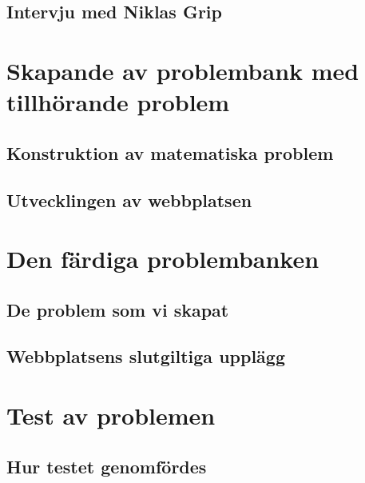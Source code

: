 \documentclass[11pt,a4paper]{article}
\begin{document}
    
    \subsection{Intervju med Niklas Grip}
    
    \label{sec:intervju}
    
\section{Skapande av problembank med tillhörande problem}
    
    
    \subsection{Konstruktion av matematiska problem}
    \label{sec:Skapandetavproblem}
        

    \subsection{Utvecklingen av webbplatsen}
        
        
\section{Den färdiga problembanken}
        
    
    \subsection{De problem som vi skapat}
        
    
    \subsection{Webbplatsens slutgiltiga upplägg}
        
    
\section{Test av problemen}
    \label{sec:testavproblemen}
    
\todo{!}
    
    \subsection{Hur testet genomfördes}
        
        
\end{document}
